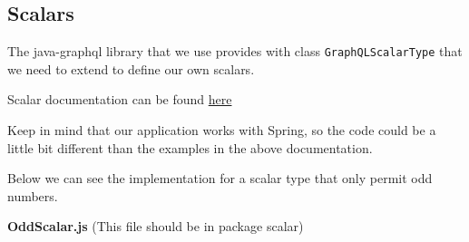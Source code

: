 \documentclass[]{book}
\begin{document}
\subsection{Scalars}\label{scalars}

The java-graphql library that we use provides with class
\texttt{GraphQLScalarType} that we need to extend to define our own
scalars.

Scalar documentation can be found
\href{https://www.graphql-java.com/documentation/master/scalars/}{here}

Keep in mind that our application works with Spring, so the code could
be a little bit different than the examples in the above documentation.

Below we can see the implementation for a scalar type that only permit
odd numbers.

\textbf{OddScalar.js} (This file should be in package scalar)
\end{document}
